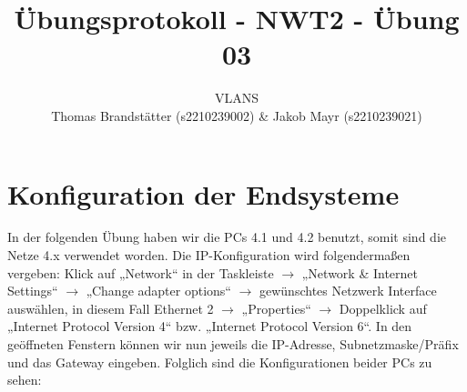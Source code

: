 \documentclass{article}
\title{Übungsprotokoll - NWT2 - Übung 03}
\author{\vspace{0.5cm} \Large VLANS\\ Thomas Brandstätter (s2210239002) \& Jakob Mayr (s2210239021)}
\begin{document}
\maketitle

\section{Konfiguration der Endsysteme}

In der folgenden Übung haben wir die PCs 4.1 und 4.2 benutzt, somit sind die Netze 4.x verwendet worden. Die IP-Konfiguration wird folgendermaßen vergeben: Klick auf „Network“ in der Taskleiste $\rightarrow$ „Network \& Internet Settings“ $\rightarrow$ „Change adapter options“ $\rightarrow$ gewünschtes Netzwerk Interface auswählen, in diesem Fall Ethernet 2 $\rightarrow$ „Properties“ $\rightarrow$ Doppelklick auf „Internet Protocol Version 4“ bzw. „Internet Protocol Version 6“. In den geöffneten Fenstern können wir nun jeweils die IP-Adresse, Subnetzmaske/Präfix und das Gateway eingeben. Folglich sind die Konfigurationen beider PCs zu sehen:
\end{document}
